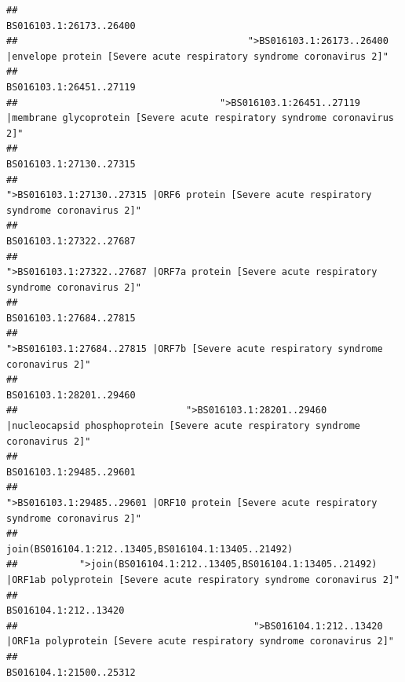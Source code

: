 \documentclass[
]{article}
\begin{document}
\begin{verbatim}
##                                                                                                                BS016103.1:26173..26400 
##                                         ">BS016103.1:26173..26400 |envelope protein [Severe acute respiratory syndrome coronavirus 2]" 
##                                                                                                                BS016103.1:26451..27119 
##                                    ">BS016103.1:26451..27119 |membrane glycoprotein [Severe acute respiratory syndrome coronavirus 2]" 
##                                                                                                                BS016103.1:27130..27315 
##                                             ">BS016103.1:27130..27315 |ORF6 protein [Severe acute respiratory syndrome coronavirus 2]" 
##                                                                                                                BS016103.1:27322..27687 
##                                            ">BS016103.1:27322..27687 |ORF7a protein [Severe acute respiratory syndrome coronavirus 2]" 
##                                                                                                                BS016103.1:27684..27815 
##                                                    ">BS016103.1:27684..27815 |ORF7b [Severe acute respiratory syndrome coronavirus 2]" 
##                                                                                                                BS016103.1:28201..29460 
##                              ">BS016103.1:28201..29460 |nucleocapsid phosphoprotein [Severe acute respiratory syndrome coronavirus 2]" 
##                                                                                                                BS016103.1:29485..29601 
##                                            ">BS016103.1:29485..29601 |ORF10 protein [Severe acute respiratory syndrome coronavirus 2]" 
##                                                                                    join(BS016104.1:212..13405,BS016104.1:13405..21492) 
##           ">join(BS016104.1:212..13405,BS016104.1:13405..21492) |ORF1ab polyprotein [Severe acute respiratory syndrome coronavirus 2]" 
##                                                                                                                  BS016104.1:212..13420 
##                                          ">BS016104.1:212..13420 |ORF1a polyprotein [Severe acute respiratory syndrome coronavirus 2]" 
##                                                                                                                BS016104.1:21500..25312 

\end{verbatim}
\end{document}
